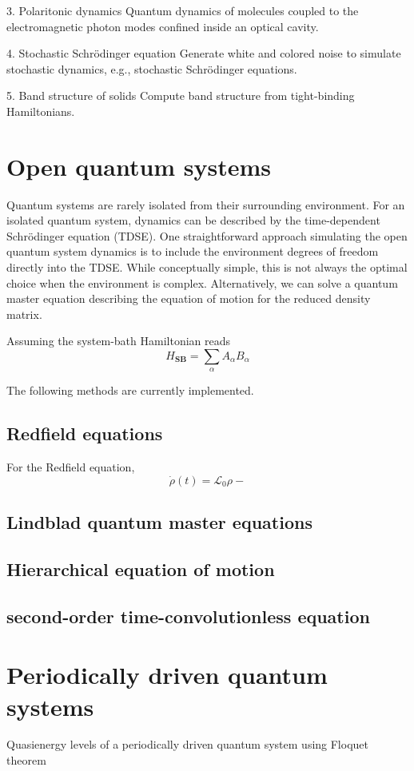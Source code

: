 \documentclass[a4paper,12pt]{book}
\newcommand{\be}{\begin{equation}}
\newcommand{\ee}{\end{equation}}
\newcommand{\mc}{\mathcal}
\begin{document}
3. Polaritonic dynamics
Quantum dynamics of molecules coupled to the electromagnetic photon modes confined inside an optical cavity.

4. Stochastic Schrödinger equation
Generate white and colored noise to simulate stochastic dynamics, e.g., stochastic Schrödinger equations.

5. Band structure of solids
Compute band structure from tight-binding Hamiltonians.

\chapter{Open quantum systems}
Quantum systems are rarely isolated from their surrounding environment. For an isolated quantum system, dynamics can be described by the time-dependent Schrödinger equation (TDSE). One straightforward approach simulating the open quantum system dynamics is to include the environment degrees of freedom directly into the TDSE. While conceptually simple, this is not always the optimal choice when the environment is complex. Alternatively, we can solve a quantum master equation describing the equation of motion for the reduced density matrix.


Assuming the system-bath Hamiltonian reads 
\be
H_\textbf{SB} = \sum_\alpha A_\alpha B_\alpha   
\ee 

The following methods are currently implemented.

\section{Redfield equations}

For the Redfield equation, 
\be
\dot{\rho}(t) = \mc{L}_0 \rho -  
\ee 

\section{Lindblad quantum master equations}
\section{Hierarchical equation of motion}
\section{second-order time-convolutionless equation}

\chapter{Periodically driven quantum systems}
Quasienergy levels of a periodically driven quantum system using Floquet theorem
\end{document}
